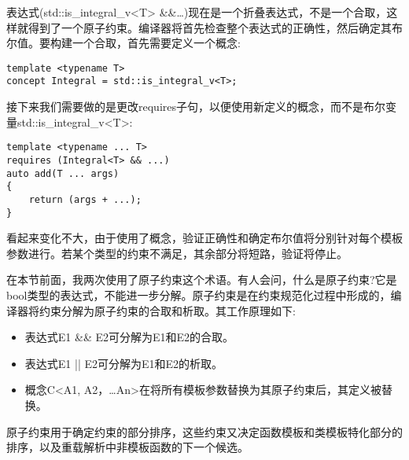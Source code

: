 表达式(std::is\_integral\_v<T> \&\&…)现在是一个折叠表达式，不是一个合取，这样就得到了一个原子约束。编译器将首先检查整个表达式的正确性，然后确定其布尔值。要构建一个合取，首先需要定义一个概念:

\begin{lstlisting}[style=styleCXX]
template <typename T>
concept Integral = std::is_integral_v<T>;
\end{lstlisting}

接下来我们需要做的是更改requires子句，以便使用新定义的概念，而不是布尔变量std::is\_integral\_v<T>:

\begin{lstlisting}[style=styleCXX]
template <typename ... T>
requires (Integral<T> && ...)
auto add(T ... args)
{
	return (args + ...);
}
\end{lstlisting}

看起来变化不大，由于使用了概念，验证正确性和确定布尔值将分别针对每个模板参数进行。若某个类型的约束不满足，其余部分将短路，验证将停止。

在本节前面，我两次使用了原子约束这个术语。有人会问，什么是原子约束?它是bool类型的表达式，不能进一步分解。原子约束是在约束规范化过程中形成的，编译器将约束分解为原子约束的合取和析取。其工作原理如下:

\begin{itemize}
\item
表达式E1 \&\& E2可分解为E1和E2的合取。

\item
表达式E1 || E2可分解为E1和E2的析取。

\item
概念C<A1, A2，…An>在将所有模板参数替换为其原子约束后，其定义被替换。
\end{itemize}

原子约束用于确定约束的部分排序，这些约束又决定函数模板和类模板特化部分的排序，以及重载解析中非模板函数的下一个候选。











